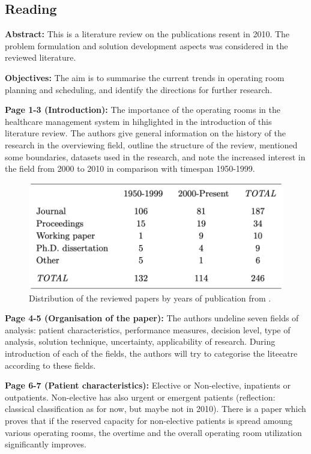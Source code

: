 \subsection{Reading}
    \textbf{Abstract:}
    This is a literature review on the publications resent in 2010. The problem formulation and solution development aspects was considered in the reviewed literature.
    
    \textbf{Objectives:}
    The aim is to summarise the current trends in operating room planning and scheduling, and identify the directions for further research.
    
    \textbf{Page 1-3 (Introduction):}
    The importance of the operating rooms in the healthcare management system in hihglighted in the introduction of this literature review. The authors give general information on the history of the research in the overviewing field, outline the structure of the review, mentioned some boundaries, datasets used in the research, and note the increased interest in the field from 2000 to 2010 in comparison with timespan 1950-1999. 
    \begin{figure}[H]
        \centering
        \includegraphics[width=1\textwidth]{figures/SR0020BE10/fig1.png}
        \caption{Distribution of the reviewed papers by years of publication from \cite{x228}.}
        \label{fig1:SR0020BE10}
    \end{figure}
    
    \textbf{Page 4-5 (Organisation of the paper):}
    The authors undeline seven fields of analysis: patient characteristics, performance measures, decision level, type of analysis, solution technique, uncertainty, applicability of research. During introduction of each of the fields, the authors will try to categorise the liteeatre according to these fields.

    \textbf{Page 6-7 (Patient characteristics):} 
    Elective or Non-elective, inpatients or outpatients. Non-elective has also urgent or emergent patients (reflection: classical classification as for now, but maybe not in 2010). There is a paper which proves that if the reserved capacity for non-elective patients is spread amoung various operating rooms, the overtime and the overall operating room utilization significantly improves.
    
